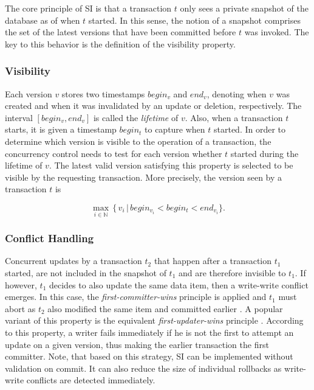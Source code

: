 The core principle of \ac{SI} is that a transaction $t$ only sees a private
snapshot of the database as of when $t$ started. In this sense, the notion of a
snapshot comprises the set of the latest versions that have been committed
before $t$ was invoked. The key to this behavior is the definition of the
visibility property.

\subsubsection{Visibility}

Each version $v$ stores two timestamps $begin_v$ and $end_v$, denoting when $v$
was created and when it was invalidated by an update or deletion, respectively.
The interval $[begin_v,  end_v]$ is called the \emph{lifetime} of $v$. Also,
when a transaction $t$ starts, it is given a timestamp $begin_t$ to capture when
$t$ started. In order to determine which version is visible to the operation of
a transaction, the concurrency control needs to test for each version whether
$t$ started during the lifetime of $v$. The latest valid version satisfying this
property is selected to be visible by the requesting transaction. More
precisely, the version seen by a transaction $t$ is

\[
\operatorname*{max}_{i \in \mathbb{N}}\, \{\, v_i\, |\, begin_{v_i} < begin_t < end_{v_i}\}.
\]

\subsubsection{Conflict Handling}

Concurrent updates by a transaction $t_2$ that happen after a transaction $t_1$
started, are not included in the snapshot of $t_1$ and are therefore invisible
to $t_1$. If however, $t_1$ decides to also update the same data item, then a
write-write conflict emerges. In this case, the \emph{first-committer-wins}
principle is applied and $t_1$ must abort as $t_2$ also modified the same item
and committed earlier \cite{berenson1995critique}. A popular variant of this
property is the equivalent \emph{first-updater-wins} principle
\cite{fekete2004read, larson2011high}. According to this property, a writer
fails immediately if he is not the first to attempt an update on a given
version, thus making the earlier transaction the first committer. Note, that
based on this strategy, \ac{SI} can be implemented without validation on commit.
It can also reduce the size of individual rollbacks as write-write conflicts are
detected immediately.

